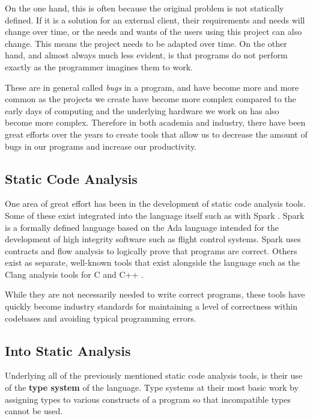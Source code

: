 \documentclass{l4proj}
\begin{document}
On the one hand, this is often because the original problem is not statically defined.
If it is a solution for an external client, their requirements and needs will change over time, or the needs and wants of the users using this project can also change.
This means the project needs to be adapted over time.
On the other hand, and almost always much less evident, is that programs do not perform exactly as the programmer imagines them to work.

These are in general called \emph{bugs} in a program, and have become more and more common as the projects we create have become more complex compared to the early days of computing and the underlying hardware we work on has also become more complex.
Therefore in both academia and industry, there have been great efforts over the years to create tools that allow us to decrease the amount of bugs in our programs and increase our productivity.

\subsection{Static Code Analysis}

One area of great effort has been in the development of static code analysis tools.
Some of these exist integrated into the language itself such as with Spark \citep{Carre1990}.
Spark is a formally defined language based on the Ada \citep{Ada1979} language intended for the development of high integrity software such as flight control systems.
Spark uses contracts and flow analysis to logically prove that programs are correct.
Others exist as separate, well-known tools that exist alongside the language such as the Clang analysis tools for C and C++ \citep{kremenek2008}.

While they are not necessarily needed to write correct programs, these tools have quickly become industry standards for maintaining a level of correctness within codebases and avoiding typical programming errors.

\subsection{Into Static Analysis}

Underlying all of the previously mentioned static code analysis tools, is their use of the \textbf{type system} of the language.
Type systems at their most basic work by assigning types to various constructs of a program so that incompatible types cannot be used.
\end{document}
